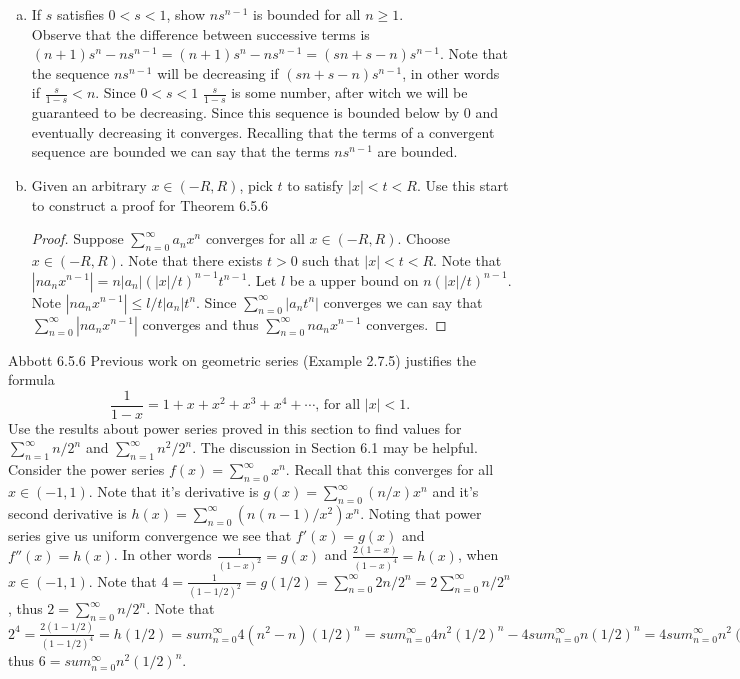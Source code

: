 \documentclass[12pt]{article}
\makeatletter
\theoremstyle{homework}
\newenvironment{exercise}[1]
{\def\@currentlabel{#1}\exercisecore}
{\endexercisecore}
\makeatother
\begin{document}
\begin{enumerate}[(a)] 
\item If $s$ satisfies $0<s<1$, show $ns^{n-1}$ is bounded for all $n\ge1$.\\
Observe that the difference between successive terms is $(n+1)s^{n}-ns^{n-1}=(n+1)s^{n}-ns^{n-1}=(sn+s-n)s^{n-1}$.  Note that the sequence $ns^{n-1}$ will be decreasing if $(sn+s-n)s^{n-1}$, in other words if $\frac{s}{1-s}<n$.  Since $0<s<1$ $\frac{s}{1-s}$ is some number, after witch we will be guaranteed to be decreasing.  Since this sequence is bounded below by 0 and eventually decreasing it converges.  Recalling that the terms of a convergent sequence are bounded we can say that the terms $ns^{n-1}$ are bounded.
\item Given an arbitrary $x \in (-R,R)$, pick $t$ to satisfy $|x|<t<R$. Use this start to construct a proof for Theorem 6.5.6
\begin{proof}
Suppose $\sum_{n=0}^\infty a_n x^n$ converges for all $x \in (-R,R)$.  Choose $x \in (-R,R)$.  Note that there exists $t>0$ such that $|x|<t<R$.  Note that $|na_n x^{n-1}|=n|a_n| (|x|/t)^{n-1} t^{n-1}$.  Let $l$ be a upper bound on $n(|x|/t)^{n-1}$.  Note $|na_n x^{n-1}|\leq l/t|a_n| t^{n}$.  Since $\sum_{n=0}^\infty |a_n t^n|$ converges we can say that $\sum_{n=0}^\infty |na_n x^{n-1}|$ converges and thus $\sum_{n=0}^\infty na_n x^{n-1}$ converges.
\end{proof}
\end{enumerate}
\begin{exercise}
7
Abbott 6.5.6
\end{exercise}
Previous work on geometric series (Example 2.7.5) justifies the formula $$\frac{1}{1-x} = 1 + x + x^2 + x^3 + x^4 + \cdots \text{, for all } |x|<1.$$
Use the results about power series proved in this section to find values for $\sum_{n=1}^\infty n/2^n$ and $\sum_{n=1}^\infty n^2/2^n$. The discussion in Section 6.1 may be helpful.\\
Consider the power series $f(x)=\sum_{n=0}^\infty x^n$.  Recall that this converges for all $x\in (-1,1)$.  Note that it's derivative is $g(x)=\sum_{n=0}^\infty (n/x) x^n$ and it's second derivative is $h(x)=\sum_{n=0}^\infty (n(n-1)/x^2) x^n$.  Noting that power series give us uniform convergence we see that $f'(x)=g(x)$ and $f''(x)=h(x)$.  In other words $\frac{1}{(1-x)^2}=g(x)$ and $\frac{2(1-x)}{(1-x)^4}=h(x)$, when $x\in (-1,1)$.  Note that $4=\frac{1}{(1-1/2)^2}=g(1/2)=\sum_{n=0}^\infty 2n/2^n=2\sum_{n=0}^\infty n/2^n$, thus $2=\sum_{n=0}^\infty n/2^n$.  Note that $2^4=\frac{2(1-1/2)}{(1-1/2)^4}=h(1/2)=sum_{n=0}^\infty 4(n^2-n) (1/2)^n=sum_{n=0}^\infty 4n^2(1/2)^n-4sum_{n=0}^\infty n (1/2)^n=4sum_{n=0}^\infty n^2(1/2)^n-8$ thus $6=sum_{n=0}^\infty n^2(1/2)^n$.
\end{document}
